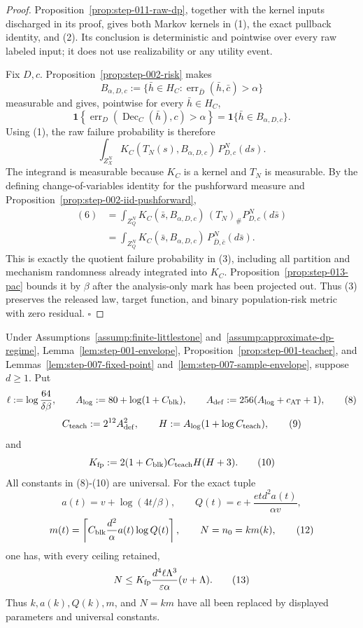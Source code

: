 \begin{proof}
Proposition~\ref{prop:step-011-raw-dp}, together with
the kernel inputs discharged in its  proof, gives both Markov
kernels in (1), the exact pullback identity, and (2). Its conclusion is
deterministic and pointwise over every raw labeled input; it does not use
realizability or any utility event.

Fix \(D,c\). Proposition~\ref{prop:step-002-risk} makes
\[
 B_{\alpha,D,c}
 :=\{\bar h\in H_C:
       \operatorname{err}_{\bar D}(\bar h,\bar c)>\alpha\}
\tag{4}
\]
measurable and gives, pointwise for every \(\bar h\in H_C\),
\[
 \mathbf1\!\left\{
 \operatorname{err}_D(\operatorname{Dec}_C(\bar h),c)>\alpha
 \right\}
 =\mathbf1\{\bar h\in B_{\alpha,D,c}\}.
\tag{5}
\]
Using (1), the raw failure probability is therefore
\[
 \int_{Z_X^N}
 K_C(T_N(s),B_{\alpha,D,c})\,P_{D,c}^N(ds).
\tag{6}
\]
The integrand is measurable because \(K_C\) is a kernel and \(T_N\) is
measurable. By the defining change-of-variables identity for the pushforward
measure and Proposition~\ref{prop:step-002-iid-pushforward},
\[
\begin{aligned}
 (6)
 &=\int_{Z_Q^N}
 K_C(\bar s,B_{\alpha,D,c})\,
 (T_N)_\#P_{D,c}^N(d\bar s)\\
 &=\int_{Z_Q^N}
 K_C(\bar s,B_{\alpha,D,c})\,
 P_{\bar D,\bar c}^N(d\bar s).
\end{aligned}
\tag{7}
\]
This is exactly the quotient failure probability in (3), including all
partition and mechanism randomness already integrated into \(K_C\).
Proposition~\ref{prop:step-013-pac} bounds it by \(\beta\) after
the analysis-only mark has been projected out. Thus (3) preserves the
released law, target function, and binary population-risk metric with zero
residual. \(\square\)


\end{proof}

\begin{lemma}\label{lem:step-014-elimination}
Under Assumptions~\ref{assump:finite-littlestone}
and~\ref{assump:approximate-dp-regime}, Lemma~\ref{lem:step-001-envelope}, Proposition~\ref{prop:step-001-teacher}, and 
Lemmas~\ref{lem:step-007-fixed-point}
and~\ref{lem:step-007-sample-envelope}, suppose \(d\geq1\). Put
\[
 \ell:=\log\frac{64}{\delta\beta},
 \qquad
 A_{\log}:=80+\log(1+C_{\rm blk}),
 \qquad
 A_{\rm def}:=256(A_{\log}+c_{\rm AT}+1),
\tag{8}
\]
\[
 C_{\rm teach}:=2^{12}A_{\rm def}^2,
 \qquad
 H:=A_{\log}(1+\log C_{\rm teach}),
\tag{9}
\]
and
\[
 K_{\rm fp}:=
 2(1+C_{\rm blk})C_{\rm teach}H(H+3).
\tag{10}
\]
All constants in (8)-(10) are universal. For the exact  tuple
\[
 a(t)=v+\log(4t/\beta),\qquad
 Q(t)=e+\frac{etd^2a(t)}{\alpha v},
\tag{11}
\]
\[
 m(t)=\left\lceil
 C_{\rm blk}\frac{d^2}{\alpha}a(t)\log Q(t)
 \right\rceil,\qquad
 N=n_0=km(k),
\tag{12}
\]
one has, with every ceiling retained,
\[
 N\leq
 K_{\rm fp}
 \frac{d^4\ell\Lambda^3}{\varepsilon\alpha}
 (v+\Lambda).
\tag{13}
\]
Thus \(k,a(k),Q(k),m\), and \(N=km\) have all been replaced by displayed
parameters and universal constants.


\end{lemma}

